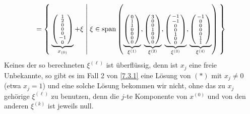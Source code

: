 \documentclass[../../main.tex]{subfiles}
\begin{document}
\begin{bsp}
\begin{multline*}
\end{multline*}
$$= \Set{\underbrace{\left(\begin{smallmatrix}1\\2\\0\\0\\0\\-1\\0\end{smallmatrix}\right)}_{x_{(0)}}+\xi | \xi \in \operatorname{span}\left(\underbrace{\left(\begin{smallmatrix}0\\1\\1\\0\\0\\0\\0\end{smallmatrix}\right)}_{\xi^{(1)}},\underbrace{\left(\begin{smallmatrix}3\\0\\0\\1\\0\\0\\0\end{smallmatrix}\right)}_{\xi^{(2)}},\underbrace{\left(\begin{smallmatrix}-1\\-1\\0\\0\\1\\0\\0\end{smallmatrix}\right)}_{\xi^{(3)}},\underbrace{\left(\begin{smallmatrix}-1\\0\\0\\0\\0\\1\\1\end{smallmatrix}\right)}_{\xi^{(4)}}\right)}$$
Keines der so berechneten $\xi^{(\ell)}$ ist überflüssig, denn ist $x_j$ eine freie Unbekannte, so gibt es im Fall 2 von \ref{7.3.1} eine Lösung von $(*)$ mit $x_j\ne0$
(etwa $x_j=1$) und eine solche Lösung bekommen wir nicht, ohne das zu $x_j$ gehörige $\xi^{(\ell)}$ zu benutzen, denn die $j$-te Komponente von $x^{(0)}$ und von
den anderen $\xi^{(k)}$ ist jeweils null.
\end{bsp}
\end{document}
